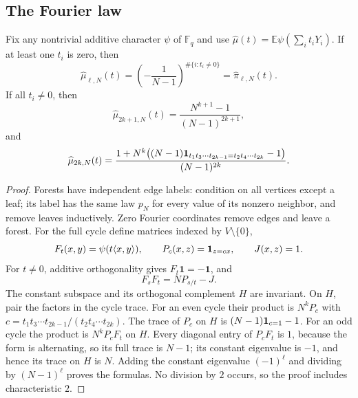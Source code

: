 \subsection{The Fourier law}\label{sec:fourier}
\begin{theorem}\label{thm:fourier}
Fix any nontrivial additive character $\psi$ of $\mathbb F_q$ and use
$\widehat\mu(t)=\mathbb E\psi(\sum_i t_iY_i)$.
If at least one $t_i$ is zero, then
\[
 \widehat\mu_{\ell,N}(t)=\left(-\frac1{N-1}\right)^{\#\{i:t_i\ne0\}}
 =\widehat\pi_{\ell,N}(t).
\]
If all $t_i\ne0$, then
\[
 \widehat\mu_{2k+1,N}(t)=\frac{N^{k+1}-1}{(N-1)^{2k+1}},
\]
and
\[
 \widehat\mu_{2k,N}(t)=
 \frac{1+N^k\bigl((N-1){\bf1}_{t_1t_3\cdots t_{2k-1}=t_2t_4\cdots t_{2k}}-1\bigr)}
 {(N-1)^{2k}}.
\]

\end{theorem}
\begin{proof}
Forests have independent edge labels: condition on all vertices except a
leaf; its label has the same law $p_N$ for every value of its nonzero
neighbor, and remove leaves inductively. Zero Fourier coordinates remove
edges and leave a forest.
For the full cycle define matrices indexed by $V\setminus\{0\}$,
\[
 F_t(x,y)=\psi(t\langle x,y\rangle),\qquad
 P_c(x,z)={\bf1}_{z=cx},\qquad J(x,z)=1.
\]
For $t\ne0$, additive orthogonality gives $F_t\mathbf1=-\mathbf1$, and
\[
 F_sF_t=NP_{s/t}-J.
\]
The constant subspace and its orthogonal complement $H$ are invariant.
On $H$, pair the factors in the cycle trace. For an even cycle their
product is $N^kP_c$ with
$c=t_1t_3\cdots t_{2k-1}/(t_2t_4\cdots t_{2k})$.
The trace of $P_c$ on $H$ is $(N-1){\bf1}_{c=1}-1$.
For an odd cycle the product is $N^kP_cF_t$ on $H$.
Every diagonal entry of $P_cF_t$ is $1$, because the form is alternating,
so its full trace is $N-1$; its constant eigenvalue is $-1$, and hence
its trace on $H$ is $N$.
Adding the constant eigenvalue $(-1)^\ell$ and dividing by
$(N-1)^\ell$ proves the formulas. No division by $2$ occurs, so the proof
includes characteristic $2$.
\end{proof}

